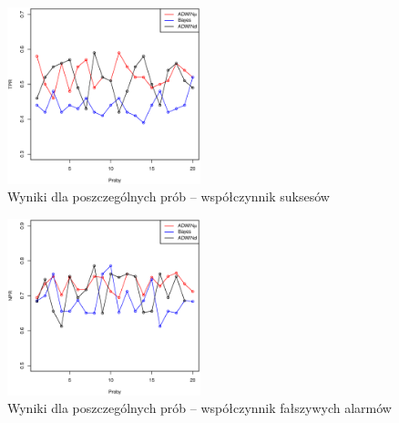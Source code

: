 \begin{figure}[htbp]
  \centering
  \includegraphics[width=0.5\textwidth]{img/ch-5-jump-res-tpr}
  \caption{Wyniki dla poszczególnych prób -- współczynnik suksesów}
  \label{fig:JumpingValuesResTpr}
\end{figure}
\begin{figure}[htbp]
  \centering
  \includegraphics[width=0.5\textwidth]{img/ch-5-jump-res-npr}
  \caption{Wyniki dla poszczególnych prób -- współczynnik fałszywych alarmów}
  \label{fig:JumpingValuesResTpr}
\end{figure}
